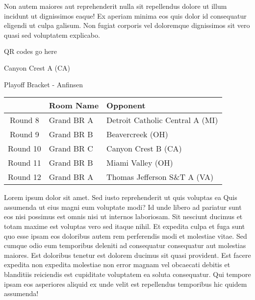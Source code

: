 \documentclass{article}%
\begin{document}
\newline%
Non autem maiores aut reprehenderit nulla sit repellendus dolore ut illum incidunt ut dignissimos eaque! Ex aperiam minima eos quis dolor id consequatur eligendi ut culpa galisum. Non fugiat corporis vel doloremque dignissimos sit vero quasi sed voluptatem explicabo.\newline%
\newline%
%
\vspace*{30pt}%
\begin{center}%
\begin{Huge}%
QR codes go here%
\end{Huge}%
\end{center}%
\newpage%
\begin{center}%
\begin{Huge}%
Canyon Crest A (CA)%
\end{Huge}%
\vspace*{8pt}%
\linebreak%
\begin{Large}%
Playoff Bracket {-} Anfinsen%
\end{Large}%
\end{center}%
%
\begin{tabularx}{\textwidth}{|c|Y|Y|}%
\hline%
&Room Name&Opponent\\%
\hline%
Round 8&Grand BR A&Detroit Catholic Central A (MI)\\%
Round 9&Grand BR B&Beavercreek (OH)\\%
Round 10&Grand BR C&Canyon Crest B (CA)\\%
Round 11&Grand BR B&Miami Valley (OH)\\%
Round 12&Grand BR A&Thomas Jefferson S\&T A (VA)\\%
\hline%
\end{tabularx}%
\vspace*{8pt}%
\linebreak%
\newline%
\newline%
Lorem ipsum dolor sit amet. Sed iusto reprehenderit ut quis voluptas ea Quis assumenda ut eius magni eum voluptate modi? Id unde libero ad pariatur sunt eos nisi possimus est omnis nisi ut internos laboriosam. Sit nesciunt ducimus et totam maxime est voluptas vero sed itaque nihil. Et expedita culpa et fuga sunt quo esse ipsam eos doloribus autem rem perferendis modi et molestiae vitae.\newline%
\newline%
Sed cumque odio eum temporibus deleniti ad consequatur consequatur aut molestias maiores. Est doloribus tenetur est dolorem ducimus sit quasi provident. Est facere expedita non expedita molestiae non error magnam vel obcaecati debitis et blanditiis reiciendis est cupiditate voluptatem ea soluta consequatur. Qui tempore ipsam eos asperiores aliquid ex unde velit est repellendus temporibus hic quidem assumenda!\newline%
\end{document}
